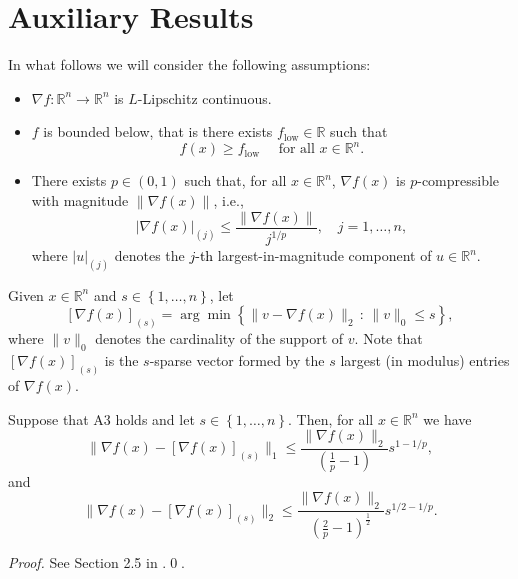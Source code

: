 \section{Auxiliary Results}

In what follows we will consider the following assumptions:

\begin{itemize}
\item[\textbf{A1}] $\nabla f:\mathbb{R}^{n}\to\mathbb{R}^{n}$ is $L$-Lipschitz continuous.
\item[\textbf{A2}] $f$ is bounded below, that is there exists $f_{\mathrm{low}}\in\mathbb{R}$ such that 
\begin{equation*}
    f(x) \geq f_{\mathrm{low}} \quad \text{ for all } x \in \mathbb{R}^n.
\end{equation*}
\item[\textbf{A3}] There exists $p\in (0,1)$ such that, for all $x\in\mathbb{R}^{n}$, $\nabla f(x)$ is $p$-compressible with magnitude $\|\nabla f(x)\|$, i.e., 
\begin{equation*}
\left|\nabla f(x)\right|_{(j)}\leq\dfrac{\|\nabla f(x)\|}{j^{1/p}},\quad j=1,\ldots,n,
\end{equation*}
where $|u|_{(j)}$ denotes the \textcolor{black}{$j$-th} largest-in-magnitude component of $u\in\mathbb{R}^{n}$.
\end{itemize}

 \noindent Given $x\in\mathbb{R}^{n}$ and $s\in\left\{1,\ldots,n\right\}$, let 
 \begin{equation*}
\left[\nabla f(x)\right]_{(s)}=\arg\min\left\{\|v-\nabla f(x)\|_{2}\,:\,\|v\|_{0}\leq s\right\},
 \end{equation*}
 where $\|v\|_0$ denotes the cardinality of the support of $v$. Note that $\left[\nabla f(x)\right]_{(s)}$ is the $s$-sparse vector formed by the $s$ largest (in mo\-du\-lus) entries of $\nabla f(x)$.

 \begin{lemma}
Suppose that A3 holds and let $s\in\left\{1,\ldots,n\right\}$. Then, for all $x\in\mathbb{R}^{n}$ we have
\begin{equation*}
\|\nabla f(x)-\left[\nabla f(x)\right]_{(s)}\|_{1}\leq\dfrac{\|\nabla f(x)\|_{2}}{\left(\frac{1}{p}-1\right)}s^{1-1/p},
\end{equation*}
and
\begin{equation*}
\|\nabla f(x)-\left[\nabla f(x)\right]_{(s)}\|_{2}\leq\dfrac{\|\nabla f(x)\|_{2}}{\left(\frac{2}{p}-1\right)^{\frac{1}{2}}}s^{1/2-1/p}.
\end{equation*}
 \label{lem:X}
 \end{lemma}
 \begin{proof}
See Section 2.5 in \cite{needell2009cosamp}.\qed.
 \end{proof}

